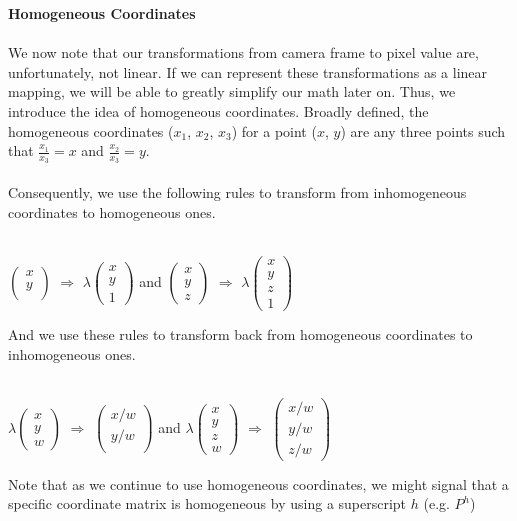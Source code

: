 \documentclass[]{article}
\begin{document}
\textbf{Homogeneous Coordinates}\\\\
We now note that our transformations from camera frame to pixel value are, unfortunately, not linear. If we can represent these transformations as a linear mapping, we will be able to greatly simplify our math later on. Thus, we introduce the idea of homogeneous coordinates. Broadly defined, the homogeneous coordinates ($x_1$, $x_2$, $x_3$) for a point ($x$, $y$) are any three points such that $\frac{x_1}{x_3} = x$ and $\frac{x_2}{x_3} = y$.\\\\ Consequently, we use the following rules to transform from inhomogeneous coordinates to homogeneous ones.\\\\
\begin{center}
$\begin{pmatrix}
x \\
y \\
\end{pmatrix}
$
$\Rightarrow$
$\lambda\begin{pmatrix}
x \\
y \\
1
\end{pmatrix}
$
and
$\begin{pmatrix}
x \\
y \\
z
\end{pmatrix}
$
$\Rightarrow$
$\lambda\begin{pmatrix}
x \\
y \\
z \\
1
\end{pmatrix}
$
\end{center}
And we use these rules to transform back from homogeneous coordinates to inhomogeneous ones. \\\\
\begin{center}
$\lambda\begin{pmatrix}
x \\
y \\
w
\end{pmatrix}
$
$\Rightarrow$
$\begin{pmatrix}
x/w \\
y/w \\
\end{pmatrix}
$
and
$\lambda\begin{pmatrix}
x \\
y \\
z \\
w
\end{pmatrix}
$
$\Rightarrow$
$\begin{pmatrix}
x/w \\
y/w \\
z/w
\end{pmatrix}
$
\end{center}
Note that as we continue to use homogeneous coordinates, we might signal that a specific coordinate matrix is homogeneous by using a superscript $h$ (e.g. $P^h$)
\end{document}
